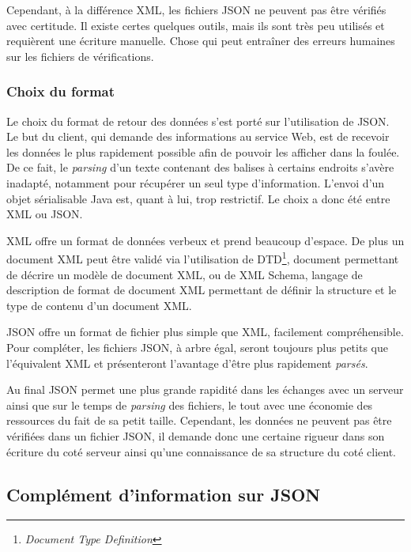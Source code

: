 Cependant, \`a la diff\'erence XML, les fichiers JSON ne peuvent pas \^etre v\'erifi\'es avec certitude.
Il existe certes quelques outils, mais ils sont tr\`es peu utilis\'es et requi\`erent une \'ecriture manuelle. 
Chose qui peut entra\^iner des erreurs humaines sur les fichiers de v\'erifications.

\subsubsection{Choix du format}

Le choix du format de retour des donn\'ees s'est port\'e sur l'utilisation de JSON.
Le but du client, qui demande des informations au service Web, est de recevoir les donn\'ees le plus rapidement possible afin de pouvoir les afficher dans la foul\'ee.
De ce fait, le \textit{parsing} d'un texte contenant des balises \`a certains endroits s'av\`ere inadapt\'e, notamment pour r\'ecup\'erer un seul type d'information.
L'envoi d'un objet s\'erialisable Java est, quant \`a lui, trop restrictif. Le choix a donc \'et\'e entre XML ou JSON.

XML offre un format de donn\'ees verbeux et prend beaucoup d'espace. 
De plus un document XML peut \^etre valid\'e via l'utilisation de DTD\protect\footnote{\textit{Document Type Definition}}, document permettant de d\'ecrire un mod\`ele de document XML, ou de XML Schema, langage de description de format de document XML permettant de d\'efinir la structure et le type de contenu d'un document XML.

JSON offre un format de fichier plus simple que XML, facilement compr\'ehensible.
Pour compl\'eter, les fichiers JSON, \`a arbre \'egal, seront toujours plus petits que l'\'equivalent XML et pr\'esenteront l'avantage d'\^etre plus rapidement \textit{pars\'es}.

Au final JSON permet une plus grande rapidit\'e dans les \'echanges avec un serveur ainsi que sur le temps de \textit{parsing} des fichiers, le tout avec une \'economie des ressources du fait de sa petit taille.
Cependant, les donn\'ees ne peuvent pas \^etre v\'erifi\'ees dans un fichier JSON, il demande donc une certaine rigueur dans son \'ecriture du cot\'e serveur ainsi qu'une connaissance de sa structure du cot\'e client.

\subsection{Compl\'ement d'information sur JSON}


